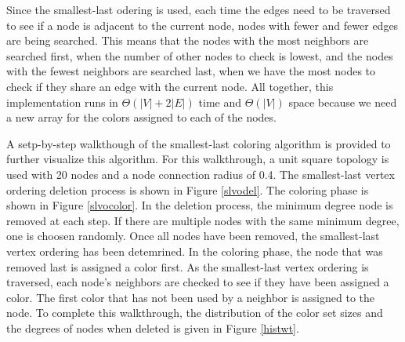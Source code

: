 \documentclass{article}
\begin{document}
        \par
        Since the smallest-last odering is used, each time the edges need to be traversed to see if a node is adjacent to the current node, nodes with fewer and fewer edges are being searched. This means that the nodes with the most neighbors are searched first, when the number of other nodes to check is lowest, and the nodes with the fewest neighbors are searched last, when we have the most nodes to check if they share an edge with the current node. All together, this implementation runs in $\Theta(|V| + 2|E|)$ time and $\Theta(|V|)$ space because we need a new array for the colors assigned to each of the nodes.
        \par
        A setp-by-step walkthough of the smallest-last coloring algorithm is provided to further visualize this algorithm. For this walkthrough, a unit square topology is used with 20 nodes and a node connection radius of 0.4. The smallest-last vertex ordering deletion process is shown in Figure \ref{slvodel}. The coloring phase is shown in Figure \ref{slvocolor}. In the deletion process, the minimum degree node is removed at each step. If there are multiple nodes with the same minimum degree, one is choosen randomly. Once all nodes have been removed, the smallest-last vertex ordering has been detemrined. In the coloring phase, the node that was removed last is assigned a color first. As the smallest-last vertex ordering is traversed, each node's neighbors are checked to see if they have been assigned a color. The first color that has not been used by a neighbor is assigned to the node. To complete this walkthrough, the distribution of the color set sizes and the degrees of nodes when deleted is given in Figure \ref{histwt}.
\end{document}
